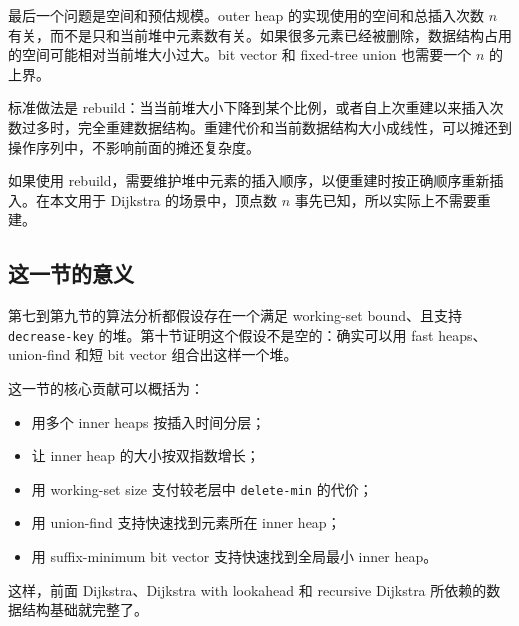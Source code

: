 \documentclass[UTF8]{ctexart}
\begin{document}
最后一个问题是空间和预估规模。outer heap 的实现使用的空间和总插入次数 \(n\) 有关，而不是只和当前堆中元素数有关。如果很多元素已经被删除，数据结构占用的空间可能相对当前堆大小过大。bit vector 和 fixed-tree union 也需要一个 \(n\) 的上界。

标准做法是 rebuild：当当前堆大小下降到某个比例，或者自上次重建以来插入次数过多时，完全重建数据结构。重建代价和当前数据结构大小成线性，可以摊还到操作序列中，不影响前面的摊还复杂度。

如果使用 rebuild，需要维护堆中元素的插入顺序，以便重建时按正确顺序重新插入。在本文用于 Dijkstra 的场景中，顶点数 \(n\) 事先已知，所以实际上不需要重建。

\subsection*{这一节的意义}

第七到第九节的算法分析都假设存在一个满足 working-set bound、且支持 \texttt{decrease-key} 的堆。第十节证明这个假设不是空的：确实可以用 fast heaps、union-find 和短 bit vector 组合出这样一个堆。

这一节的核心贡献可以概括为：

\begin{itemize}
  \item 用多个 inner heaps 按插入时间分层；
  \item 让 inner heap 的大小按双指数增长；
  \item 用 working-set size 支付较老层中 \texttt{delete-min} 的代价；
  \item 用 union-find 支持快速找到元素所在 inner heap；
  \item 用 suffix-minimum bit vector 支持快速找到全局最小 inner heap。
\end{itemize}

这样，前面 Dijkstra、Dijkstra with lookahead 和 recursive Dijkstra 所依赖的数据结构基础就完整了。
\end{document}
